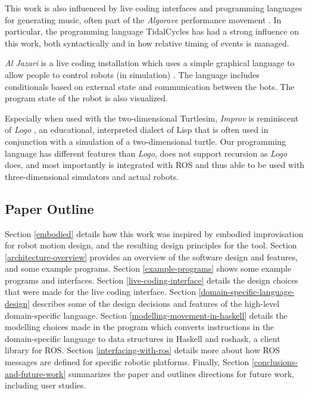 \documentclass[sigconf]{acmart}
\begin{document}
This work is also influenced by live coding interfaces and programming languages
for generating music, often part of the \emph{Algorave} performance movement
\cite{collins2014algorave}. In particular, the programming language TidalCycles
\cite{mclean2010tidal} has had a strong influence on this work, both
syntactically and in how relative timing of events is managed.

\emph{Al Jazari} is a live coding installation which uses a simple graphical
language to allow people to control robots (in simulation)
\cite{mclean2010visualisation}. The language includes conditionals based on
external state and communication between the bots. The program state of the
robot is also visualized.

Especially when used with the two-dimensional Turtlesim, \emph{Improv}
is reminiscent of \emph{Logo} \cite{logo}, an educational, interpreted
dialect of Lisp that is often used in conjunction with a simulation of a
two-dimensional turtle. Our programming language has different features
than \emph{Logo}, does not support recursion as \emph{Logo} does, and
most importantly is integrated with ROS and thus able to be used with
three-dimensional simulators and actual robots.

\subsection{Paper Outline}

Section \ref{embodied} details how this work was inspired by embodied
improvisation for robot motion design, and the resulting design principles for
the tool.
Section
\ref{architecture-overview} provides an overview of the software design and
features, and some example programs. Section \ref{example-programs} shows some example programs and
interfaces. Section \ref{live-coding-interface} details the design choices that
were made for the live coding interface. Section
\ref{domain-specific-language-design} describes some of the design decisions and
features of the high-level domain-specific language. Section
\ref{modelling-movement-in-haskell} details the modelling choices made in the
program which converts instructions in the domain-specific language to data
structures in Haskell and roshask, a client library for ROS.
Section \ref{interfacing-with-ros} details more about how ROS messages are
defined for specific robotic platforms. Finally, Section
\ref{conclusions-and-future-work} summarizes the paper and outlines directions
for future work, including user studies.
\end{document}
